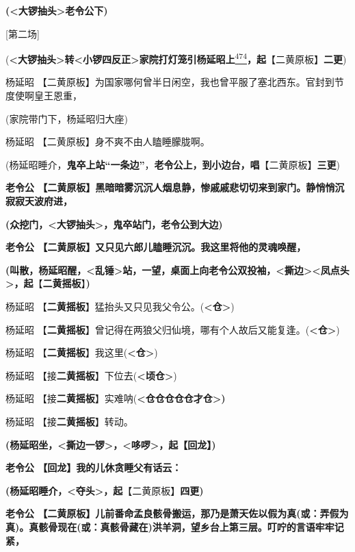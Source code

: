 \textbf{(\textless{}大锣抽头\textgreater{}老令公下)}

{[}第二场{]}

(\textbf{\textless{}大锣抽头\textgreater{}转\textless{}小锣四反正\textgreater{}家院打灯笼引杨延昭上}\protect\hyperlink{fn474}{\textsuperscript{474}}\textbf{，起}【二黄原板】\textbf{二更})

杨延昭
【二黄原板】为国家哪何曾半日闲空，我也曾平服了塞北西东。官封到节度使啊皇王恩重，

(家院带门下，杨延昭归大座)

杨延昭 【二黄原板】身不爽不由人瞌睡朦胧啊。

(杨延昭睡介，\textbf{鬼卒上站``一条边''}，\textbf{老令公上，到小边台，唱}【二黄原板】\textbf{三更})

\textbf{老令公
【二黄原板】黑暗暗雾沉沉人烟息静，惨戚戚悲切切来到家门。静悄悄沉寂寂天波府进，}

\textbf{(众挖门，\textless{}大锣抽头\textgreater{}，鬼卒站门，老令公到大边)}

\textbf{老令公 【二黄原板】又只见六郎儿瞌睡沉沉。我这里将他的灵魂唤醒，}

\textbf{(叫散，杨延昭醒，\textless{}乱锤\textgreater{}站，一望，桌面上向老令公双投袖，\textless{}撕边\textgreater{}\textless{}凤点头\textgreater{}，起}【\textbf{二黄摇板}】\textbf{)}

杨延昭
【\textbf{二黄摇板}】猛抬头又只见我父令公。(\textbf{\textless{}仓\textgreater{}})

杨延昭
【\textbf{二黄摇板}】曾记得在两狼父归仙境，哪有个人故后又能复逢。(\textbf{\textless{}仓\textgreater{}})

杨延昭 【\textbf{二黄摇板}】我这里(\textbf{\textless{}仓\textgreater{}})

杨延昭
【接\textbf{二黄摇板}】下位去(\textbf{\textless{}顷仓\textgreater{}})

杨延昭
【接\textbf{二黄摇板}】实难呐(\textbf{\textless{}仓仓仓仓仓才仓\textgreater{})}

杨延昭 【接\textbf{二黄摇板}】转动。

\textbf{(杨延昭坐，\textless{}撕边一锣\textgreater{}，\textless{}哆啰\textgreater{}，起【回龙】)}

\textbf{老令公 【回龙】我的儿休贪睡父有话云：}

\textbf{(杨延昭睡介，\textless{}夺头\textgreater{}，起}【二黄原板】\textbf{四更)}

\textbf{老令公
【二黄原板】儿前番命孟良骸骨搬运，那乃是萧天佐以假为真(或：弄假为真)。真骸骨现在(或：真骸骨藏在)洪羊洞，望乡台上第三层。叮咛的言语牢牢记紧，}

